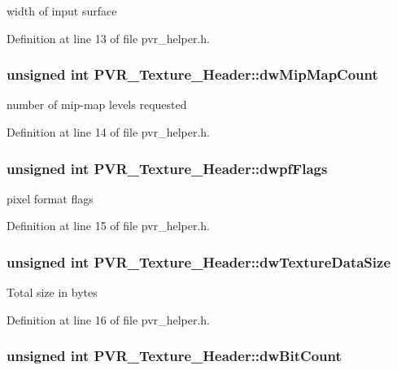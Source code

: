 width of input surface 

Definition at line 13 of file pvr\_\-helper.h.\hypertarget{struct_p_v_r___texture___header_40241f20ad91369c72a9f7285b8c4ff5}{
\subsubsection[dwMipMapCount]{\setlength{\rightskip}{0pt plus 5cm}unsigned int {\bf PVR\_\-Texture\_\-Header::dwMipMapCount}}}
\label{struct_p_v_r___texture___header_40241f20ad91369c72a9f7285b8c4ff5}


number of mip-map levels requested 

Definition at line 14 of file pvr\_\-helper.h.\hypertarget{struct_p_v_r___texture___header_b89dc74cf18383d2d41397e2e839faeb}{
\subsubsection[dwpfFlags]{\setlength{\rightskip}{0pt plus 5cm}unsigned int {\bf PVR\_\-Texture\_\-Header::dwpfFlags}}}
\label{struct_p_v_r___texture___header_b89dc74cf18383d2d41397e2e839faeb}


pixel format flags 

Definition at line 15 of file pvr\_\-helper.h.\hypertarget{struct_p_v_r___texture___header_d2a7eea61233461d085191891734177f}{
\subsubsection[dwTextureDataSize]{\setlength{\rightskip}{0pt plus 5cm}unsigned int {\bf PVR\_\-Texture\_\-Header::dwTextureDataSize}}}
\label{struct_p_v_r___texture___header_d2a7eea61233461d085191891734177f}


Total size in bytes 

Definition at line 16 of file pvr\_\-helper.h.\hypertarget{struct_p_v_r___texture___header_dc064257d63a00e00e131c7d93728067}{
\subsubsection[dwBitCount]{\setlength{\rightskip}{0pt plus 5cm}unsigned int {\bf PVR\_\-Texture\_\-Header::dwBitCount}}}
\label{struct_p_v_r___texture___header_dc064257d63a00e00e131c7d93728067}


